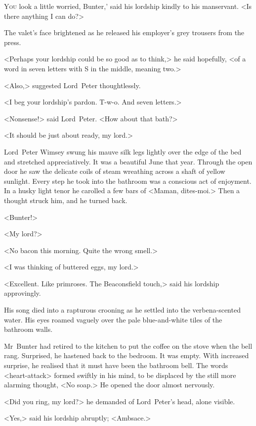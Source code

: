 
\lettrine[ante=‘]{Y}{ou} look a little worried, Bunter,' said his lordship kindly to his manservant. <Is there anything I can do?>

\zz
The valet's face brightened as he released his employer's grey trousers from the press.

<Perhaps your lordship could be so good as to think,> he said hopefully, <of a word in seven letters with S in the middle, meaning two.>

<Also,> suggested Lord~Peter thoughtlessly.

<I beg your lordship's pardon. T-w-o. And seven letters.>

<Nonsense!> said Lord~Peter. <How about that bath?>

<It should be just about ready, my lord.>

Lord~Peter Wimsey swung his mauve silk legs lightly over the edge of the bed and stretched appreciatively. It was a beautiful June that year. Through the open door he saw the delicate coils of steam wreathing across a shaft of yellow sunlight. Every step he took into the bathroom was a conscious act of enjoyment. In a husky light tenor he carolled a few bars of <Maman, dites-moi.> Then a thought struck him, and he turned back.

<Bunter!>

<My lord?>

<No bacon this morning. Quite the wrong smell.>

<I was thinking of buttered eggs, my lord.>

<Excellent. Like primroses. The Beaconsfield touch,> said his lordship approvingly.

His song died into a rapturous crooning as he settled into the verbena-scented water. His eyes roamed vaguely over the pale blue-and-white tiles of the bathroom walls.

Mr~Bunter had retired to the kitchen to put the coffee on the stove when the bell rang. Surprised, he hastened back to the bedroom. It was empty. With increased surprise, he realised that it must have been the bathroom bell. The words <heart-attack> formed swiftly in his mind, to be displaced by the still more alarming thought, <No soap.> He opened the door almost nervously.

<Did you ring, my lord?> he demanded of Lord~Peter's head, alone visible.

<Yes,> said his lordship abruptly; <Ambsace.>

